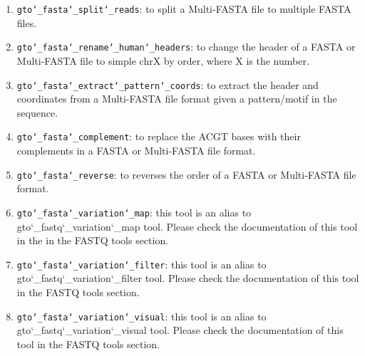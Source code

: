 \begin{enumerate}
\item \texttt{gto\char`_fasta\char`_split\char`_reads}: to split a Multi-FASTA file to multiple FASTA files.

\item \texttt{gto\char`_fasta\char`_rename\char`_human\char`_headers}: to change the header of a FASTA or Multi-FASTA file to simple chrX by order, where X is the number.

\item \texttt{gto\char`_fasta\char`_extract\char`_pattern\char`_coords}: to extract the header and coordinates from a Multi-FASTA file format given a pattern/motif in the sequence.

\item \texttt{gto\char`_fasta\char`_complement}: to replace the ACGT bases with their complements in a FASTA or Multi-FASTA file format.

\item \texttt{gto\char`_fasta\char`_reverse}: to reverses the order of a FASTA or Multi-FASTA file format.

\item \texttt{gto\char`_fasta\char`_variation\char`_map}: this tool is an alias to gto\char`_fastq\char`_variation\char`_map tool. Please check the documentation of this tool in the in the FASTQ tools section. 

\item \texttt{gto\char`_fasta\char`_variation\char`_filter}: this tool is an alias to gto\char`_fastq\char`_variation\char`_filter tool. Please check the documentation of this tool in the FASTQ tools section. 

\item \texttt{gto\char`_fasta\char`_variation\char`_visual}: this tool is an alias to gto\char`_fastq\char`_variation\char`_visual tool. Please check the documentation of this tool in the FASTQ tools section. 

\end{enumerate}





 








